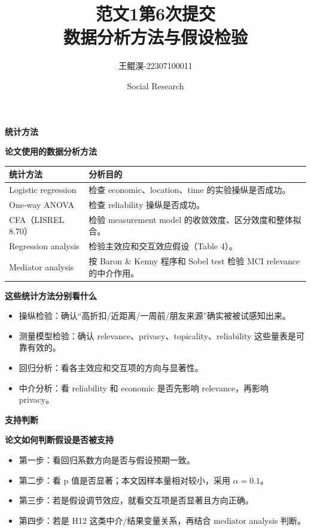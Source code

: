 \documentclass[aspectratio=169,UTF8,zihao=-4]{ctexbeamer}
\title{范文1第6次提交\\数据分析方法与假设检验}
\author{王鲲淏-22307100011}
\date{Social Research}
\newcommand{\bigidea}[1]{
  \begin{center}
    \vspace{0.8em}
    {\LARGE \bfseries #1}
    \vspace{0.6em}
  \end{center}
}
\newcommand{\sectionpageframe}[1]{
  \begin{frame}[plain]
    \begin{center}
      \vfill
      {\Huge \bfseries #1}
      \vfill
    \end{center}
  \end{frame}
}
\begin{document}
\begin{frame}[plain]
  \titlepage
\end{frame}

\sectionpageframe{统计方法}

\begin{frame}
  \bigidea{论文使用的数据分析方法}
  \small
  \begin{tabular}{p{3.2cm}p{6.8cm}}
    \toprule
    统计方法 & 分析目的 \\
    \midrule
    Logistic regression & 检查 economic、location、time 的实验操纵是否成功。 \\
    One-way ANOVA & 检查 reliability 操纵是否成功。 \\
    CFA（LISREL 8.70） & 检验 measurement model 的收敛效度、区分效度和整体拟合。 \\
    Regression analysis & 检验主效应和交互效应假设（Table 4）。 \\
    Mediator analysis & 按 Baron \& Kenny 程序和 Sobel test 检验 MCI relevance 的中介作用。 \\
    \bottomrule
  \end{tabular}
\end{frame}

\begin{frame}
  \bigidea{这些统计方法分别看什么}
  \begin{itemize}
    \item \Large 操纵检验：确认“高折扣/近距离/一周前/朋友来源”确实被被试感知出来。
    \item \Large 测量模型检验：确认 relevance、privacy、topicality、reliability 这些量表是可靠有效的。
    \item \Large 回归分析：看各主效应和交互项的方向与显著性。
    \item \Large 中介分析：看 reliability 和 economic 是否先影响 relevance，再影响 privacy。
  \end{itemize}
\end{frame}

\sectionpageframe{支持判断}

\begin{frame}
  \bigidea{论文如何判断假设是否被支持}
  \begin{itemize}
    \item \Large 第一步：看回归系数方向是否与假设预期一致。
    \item \Large 第二步：看 p 值是否显著；本文因样本量相对较小，采用 $\alpha = 0.1$。
    \item \Large 第三步：若是假设调节效应，就看交互项是否显著且方向正确。
    \item \Large 第四步：若是 H12 这类中介/结果变量关系，再结合 mediator analysis 判断。
  \end{itemize}
\end{frame}
\end{document}
